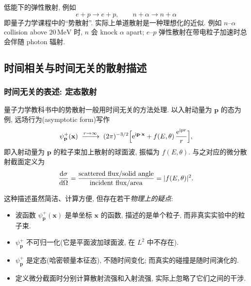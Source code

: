 \begin{example}[单道近似]
低能下的弹性散射, 例如
\begin{equation}
e+p\to e+p,\qquad n+\alpha\to n+\alpha
\end{equation}
即量子力学课程中的``势散射''. 实际上单道散射是一种理想化的近似. 例如 $n$--$\alpha$ collision above $20\,\mathrm{MeV}$ 时, $n$ 会 knock $\alpha$ apart; $e$--$p$ 弹性散射在带电粒子加速时总会伴随 photon 辐射.
\end{example}

\subsection{时间相关与时间无关的散射描述}\label{subsec:td-vs-ti}

\subsubsection{时间无关的表述: 定态散射}

量子力学教科书中的势散射一般用时间无关的方法处理. 以入射动量为 $\mathbf{p}$ 的态为例, 远场行为(asymptotic form)写作
\begin{equation}\label{eq:psip-asymptotic}
\psi^{+}_{\mathbf p}(\mathbf x)\;\xrightarrow{r\to\infty}\;(2\pi)^{-3/2}\Big[\mathrm{e}^{\mathrm{i}\mathbf{p}\cdot\mathbf{x}}+f(E,\theta)\,\frac{\mathrm{e}^{\mathrm{i} p r}}{r}\Big],
\end{equation}
即入射动量为 $\mathbf{p}$ 的粒子束加上散射的球面波, 振幅为 $f(E,\theta)$. 与之对应的微分散射截面定义为
\begin{equation}\label{eq:diff-cross-section}
\frac{\mathrm{d}\sigma}{\mathrm{d}\Omega}=\frac{\text{scattered flux/solid angle}}{\text{incident flux/area}}=|f(E,\theta)|^{2}.
\end{equation}

这种描述虽然简洁、计算方便, 但存在若干\emph{物理上的疑点}:
\begin{itemize}
    \item 波函数 $\psi^{+}_{\mathbf p}(\mathbf x)$ 是单坐标 $\mathbf x$ 的函数, 描述的是单个粒子, 而非真实实验中的粒子束.
    \item $\psi^{+}_{\mathbf p}$ 不可归一化(它是平面波加球面波, 在 $L^{2}$ 中不存在).
    \item $\psi^{+}_{\mathbf p}$ 是定态(哈密顿量本征态), 不随时间变化; 而真实的碰撞是随时间演化的.
    \item 定义微分截面时分别计算散射流强和入射流强, 实际上忽略了它们之间的干涉.
\end{itemize}


